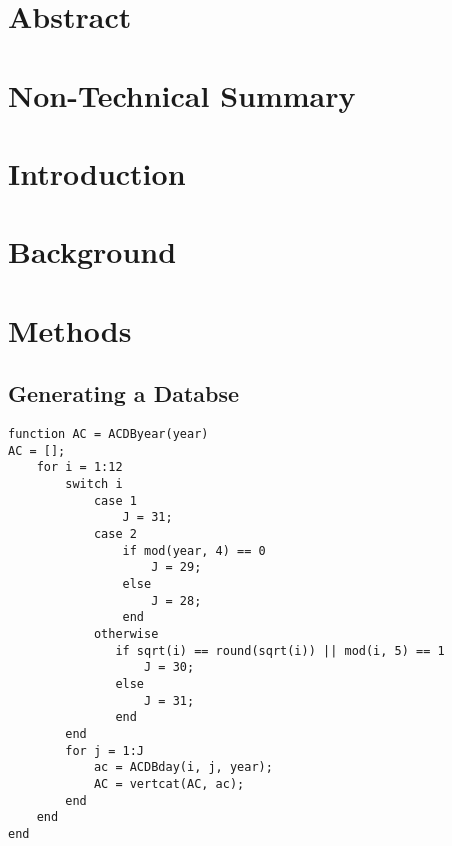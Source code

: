 \documentclass[12pt]{article}
\begin{document}
\pagestyle{plain}

\title{}
\author{John DeSalvo}
\maketitle

\tableofcontents

\section{Abstract}

\section{Non-Technical Summary}

\section{Introduction}

\section{Background}

\section{Methods}
\subsection{Generating a Databse}
\sloppy
{}
\setlength{\parindent}{0pt}
\begin{verbatim}
function AC = ACDByear(year)
AC = [];
	for i = 1:12
        switch i
            case 1
                J = 31;
            case 2
                if mod(year, 4) == 0
                    J = 29;
                else
                    J = 28;
                end
            otherwise
               if sqrt(i) == round(sqrt(i)) || mod(i, 5) == 1
                   J = 30;
               else
                   J = 31;
               end
        end
        for j = 1:J
            ac = ACDBday(i, j, year);
            AC = vertcat(AC, ac);
        end
    end
end
\end{verbatim}
\end{document}
